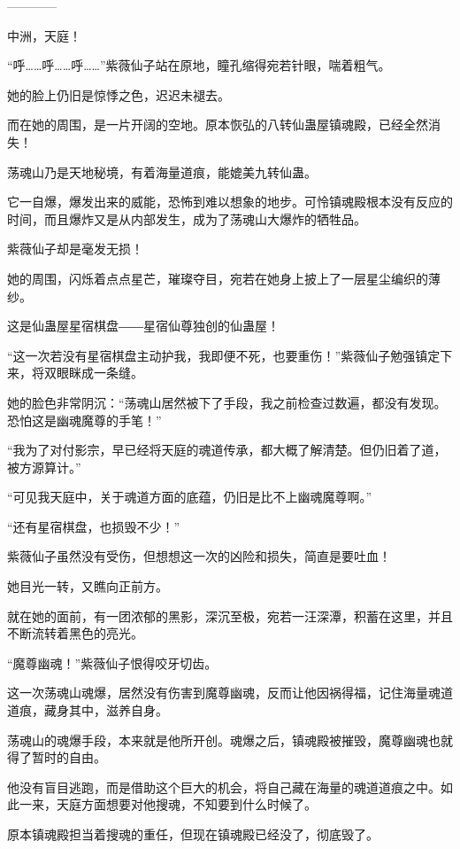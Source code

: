 
\begin{this_body}

------------

中洲，天庭！

“呼……呼……呼……”紫薇仙子站在原地，瞳孔缩得宛若针眼，喘着粗气。

她的脸上仍旧是惊悸之色，迟迟未褪去。

而在她的周围，是一片开阔的空地。原本恢弘的八转仙蛊屋镇魂殿，已经全然消失！

荡魂山乃是天地秘境，有着海量道痕，能媲美九转仙蛊。

它一自爆，爆发出来的威能，恐怖到难以想象的地步。可怜镇魂殿根本没有反应的时间，而且爆炸又是从内部发生，成为了荡魂山大爆炸的牺牲品。

紫薇仙子却是毫发无损！

她的周围，闪烁着点点星芒，璀璨夺目，宛若在她身上披上了一层星尘编织的薄纱。

这是仙蛊屋星宿棋盘――星宿仙尊独创的仙蛊屋！

“这一次若没有星宿棋盘主动护我，我即便不死，也要重伤！”紫薇仙子勉强镇定下来，将双眼眯成一条缝。

她的脸色非常阴沉：“荡魂山居然被下了手段，我之前检查过数遍，都没有发现。恐怕这是幽魂魔尊的手笔！”

“我为了对付影宗，早已经将天庭的魂道传承，都大概了解清楚。但仍旧着了道，被方源算计。”

“可见我天庭中，关于魂道方面的底蕴，仍旧是比不上幽魂魔尊啊。”

“还有星宿棋盘，也损毁不少！”

紫薇仙子虽然没有受伤，但想想这一次的凶险和损失，简直是要吐血！

她目光一转，又瞧向正前方。

就在她的面前，有一团浓郁的黑影，深沉至极，宛若一汪深潭，积蓄在这里，并且不断流转着黑色的亮光。

“魔尊幽魂！”紫薇仙子恨得咬牙切齿。

这一次荡魂山魂爆，居然没有伤害到魔尊幽魂，反而让他因祸得福，记住海量魂道道痕，藏身其中，滋养自身。

荡魂山的魂爆手段，本来就是他所开创。魂爆之后，镇魂殿被摧毁，魔尊幽魂也就得了暂时的自由。

他没有盲目逃跑，而是借助这个巨大的机会，将自己藏在海量的魂道道痕之中。如此一来，天庭方面想要对他搜魂，不知要到什么时候了。

原本镇魂殿担当着搜魂的重任，但现在镇魂殿已经没了，彻底毁了。


\end{this_body}
